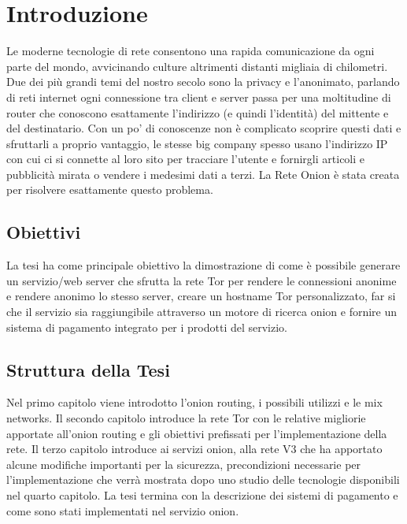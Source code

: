 \chapter{Introduzione}
\label{chap:intro}

Le moderne tecnologie di rete consentono una rapida comunicazione da ogni parte del mondo, avvicinando culture altrimenti distanti migliaia di chilometri. Due dei più grandi temi del nostro secolo sono la privacy e l'anonimato, parlando di reti internet ogni connessione tra client e server passa per una moltitudine di router che conoscono esattamente l'indirizzo (e quindi l'identità) del mittente e del destinatario. Con un po' di conoscenze non è complicato scoprire questi dati e sfruttarli a proprio vantaggio, le stesse big company spesso usano l'indirizzo IP con cui ci si connette al loro sito per tracciare l'utente e fornirgli articoli e pubblicità mirata o vendere i medesimi dati a terzi. 
La Rete Onion è stata creata per risolvere esattamente questo problema.

\section{Obiettivi}

La tesi ha come principale obiettivo la dimostrazione di come è possibile generare un servizio/web server che sfrutta la rete Tor per rendere le connessioni anonime e rendere anonimo lo stesso server, creare un hostname Tor personalizzato, far si che il servizio sia raggiungibile attraverso un motore di ricerca onion e fornire un sistema di pagamento integrato per i prodotti del servizio.

\section{Struttura della Tesi}
Nel primo capitolo viene introdotto l'onion routing, i possibili utilizzi e le mix networks. 
Il secondo capitolo introduce la rete Tor con le relative migliorie apportate all'onion routing e gli obiettivi prefissati per l'implementazione della rete.
Il terzo capitolo introduce ai servizi onion, alla rete V3 che ha apportato alcune modifiche importanti per la sicurezza, precondizioni necessarie per l'implementazione che verrà mostrata dopo uno studio delle tecnologie disponibili nel quarto capitolo. La tesi termina con la descrizione dei sistemi di pagamento e come sono stati implementati nel servizio onion.